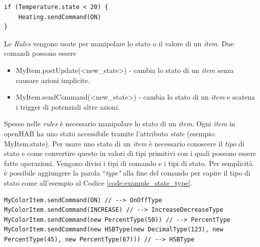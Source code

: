 \begin{lstlisting}[caption=Esempio Script,label=code:script_example]
if (Temperature.state < 20) {
    Heating.sendCommand(ON)
}
\end{lstlisting}

Le {\em Rules} vengono usate per manipolare lo stato o il valore di un {\em item}. Due comandi possono essere
\begin{itemize}
    \item MyItem.postUpdate(\textless new\_state\textgreater) - cambia lo stato di un {\em item} senza causare azioni implicite.
    \item MyItem.sendCommand(\textless new\_state\textgreater ) - cambia lo stato di un {\em item} e scatena i trigger di potenziali altre azioni.
\end{itemize}

Spesso nelle {\em rules} è necessario manipolare lo stato di un {\em item}. Ogni {\em item} in openHAB ha uno stato accessibile tramite l'attributo {\em state} (esempio: MyItem.state). Per usare uno stato di un {\em item} è necessario conoscere il {\em tipo} di stato e come convertire questo in valori di tipi primitivi con i quali possono essere fatte operazioni. Vengono divisi i tipi di comando e i tipi di stato. Per semplicità è possibile aggiungere la parola ``{\em type"} alla fine del comando per capire il tipo di stato come all'esempio al Codice \ref{code:example_state_type}.

\begin{lstlisting}[caption=Esempio State Type,label=code:example_state_type]
MyColorItem.sendCommand(ON) // --> OnOffType
MyColorItem.sendCommand(INCREASE) // --> IncreaseDecreaseType
MyColorItem.sendCommand(new PercentType(50)) // --> PercentType
MyColorItem.sendCommand(new HSBType(new DecimalType(123), new PercentType(45), new PercentType(67))) // --> HSBType
\end{lstlisting}

